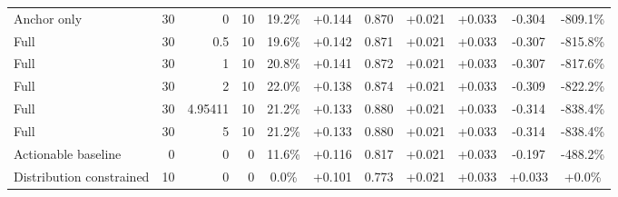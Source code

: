 \begin{table}[htbp]
\begin{tabular}{lrrrccccccc}
Anchor only & 30 & 0 & 10 & 19.2\% & +0.144 & 0.870 & +0.021 & +0.033 & -0.304 & -809.1\% \\
Full & 30 & 0.5 & 10 & 19.6\% & +0.142 & 0.871 & +0.021 & +0.033 & -0.307 & -815.8\% \\
Full & 30 & 1 & 10 & 20.8\% & +0.141 & 0.872 & +0.021 & +0.033 & -0.307 & -817.6\% \\
Full & 30 & 2 & 10 & 22.0\% & +0.138 & 0.874 & +0.021 & +0.033 & -0.309 & -822.2\% \\
Full & 30 & 4.95411 & 10 & 21.2\% & +0.133 & 0.880 & +0.021 & +0.033 & -0.314 & -838.4\% \\
Full & 30 & 5 & 10 & 21.2\% & +0.133 & 0.880 & +0.021 & +0.033 & -0.314 & -838.4\% \\
Actionable baseline & 0 & 0 & 0 & 11.6\% & +0.116 & 0.817 & +0.021 & +0.033 & -0.197 & -488.2\% \\
Distribution constrained & 10 & 0 & 0 & 0.0\% & +0.101 & 0.773 & +0.021 & +0.033 & +0.033 & +0.0\% \\
\bottomrule
\end{tabular}
\end{table}